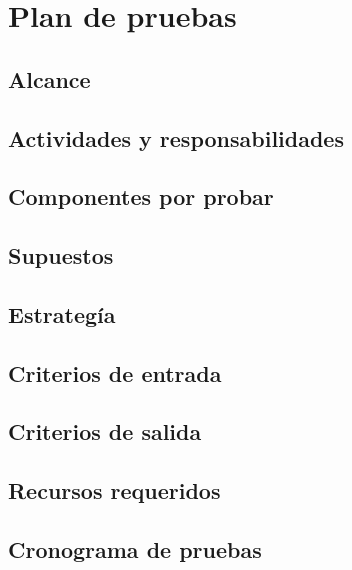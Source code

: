 \section{Plan de pruebas}
\label{section:plan-pruebas}

\Blindtext[1]

\subsection{Alcance}
\label{subsection:plan-pruebas:alcance}

\Blindtext[1]

\subsection{Actividades y responsabilidades}
\label{subsection:plan-pruebas:responsabilidades}

\Blindtext[1]

\subsection{Componentes por probar}
\label{subsection:plan-pruebas:componentes}

\Blindtext[1]

\subsection{Supuestos}
\label{subsection:plan-pruebas:supuestos}

\Blindtext[1]

\subsection{Estrategía}
\label{subsection:plan-pruebas:estrategia}

\Blindtext[1]

\subsection{Criterios de entrada}
\label{subsection:plan-pruebas:criterios-entrada}

\Blindtext[1]

\subsection{Criterios de salida}
\label{subsection:plan-pruebas:criterios-salida}

\Blindtext[1]

\subsection{Recursos requeridos}
\label{subsection:plan-pruebas:recursos}

\Blindtext[1]

\subsection{Cronograma de pruebas}
\label{subsection:plan-section:cronograma}

\Blindtext[1]

